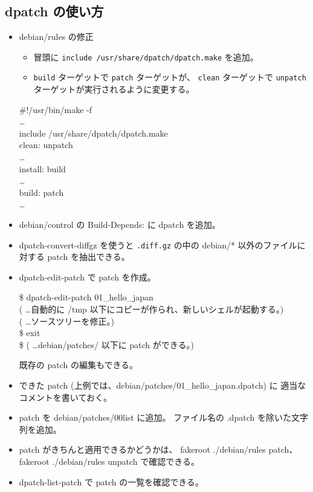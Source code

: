 \documentclass[mingoth,a4paper]{jsarticle}
\begin{document}
\subsection{dpatch の使い方}

\begin{itemize}
\item debian/rules の修正
  \begin{itemize}
  \item 冒頭に \texttt{include /usr/share/dpatch/dpatch.make} を追加。
  \item \texttt{build} ターゲットで \texttt{patch} ターゲットが、
    \texttt{clean} ターゲットで
    \texttt{unpatch} ターゲットが実行されるように変更する。
  \end{itemize}
  \begin{screen}[5]
    \#!/usr/bin/make -f \\
    \hspace{4em}\ldots \\
    include /usr/share/dpatch/dpatch.make \\
    clean: unpatch \\
    \hspace{4em}\ldots \\
    install: build \\
    \hspace{4em}\ldots \\
    build: patch \\
    \hspace{4em}\ldots
  \end{screen}
\item debian/control の Build-Depends: に dpatch を追加。
\item \textsf{dpatch-convert-diffgz} を使うと \texttt{.diff.gz} の中の
  debian/* 以外のファイルに対する patch を抽出できる。
\item \textsf{dpatch-edit-patch} で patch を作成。
  \begin{screen}[5]
    \$ dpatch-edit-patch 01\_hello\_japan \\
    ( \ldots 自動的に /tmp 以下にコピーが作られ、新しいシェルが起動する。) \\
    ( \ldots ソースツリーを修正。) \\
    \$ exit \\
    \$ 
    ( \ldots debian/patches/ 以下に patch ができる。)
  \end{screen}
  既存の patch の編集もできる。
\item できた patch (上例では、debian/patches/01\_hello\_japan.dpatch) に
  適当なコメントを書いておく。
\item patch を debian/patches/00list に追加。
  ファイル名の .dpatch を除いた文字列を追加。
\item patch がきちんと適用できるかどうかは、
  \textsf{fakeroot ./debian/rules patch}、
  \textsf{fakeroot ./debian/rules unpatch} で確認できる。
\item \textsf{dpatch-list-patch} で patch の一覧を確認できる。
\end{itemize}
\end{document}

